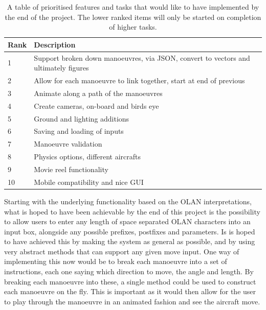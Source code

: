 \clearpage

\begin{table}[h!]
\caption{A table of prioritised features and tasks that would like to have implemented by the end of the project. The lower ranked items will only be started on completion of higher tasks.}
 \label{tbl:rank-table}
\begin{tabular}{|l|l|}
\hline
\textbf{Rank} & \textbf{Description}                                                                \\ \hline
1             & Support broken down manoeuvres, via JSON, convert to vectors and ultimately figures \\ \hline
2             & Allow for each manoeuvre to link together, start at end of previous                 \\ \hline
3             & Animate along a path of the manoeuvres                                              \\ \hline
4             & Create cameras, on-board and birds eye                                               \\ \hline
5             & Ground and lighting additions                                                       \\ \hline
6             & Saving and loading of inputs                                                        \\ \hline
7             & Manoeuvre validation                                                                \\ \hline
8             & Physics options, different aircrafts                                                \\ \hline
9             & Movie reel functionality                                                            \\ \hline
10            & Mobile compatibility and nice GUI                                                   \\ \hline
\end{tabular}
\end{table}

Starting with the underlying functionality based on the OLAN interpretations, what is hoped to have been achievable by the end of this project is the possibility to allow users to enter any length of space separated OLAN characters into an input box, alongside any possible prefixes, postfixes and parameters. Is is hoped to have achieved this by making the system as general as possible, and by using very abstract methods that can support any given move input. One way of implementing this now would be to break each manoeuvre into a set of instructions, each one saying which direction to move, the angle and length. By breaking each manoeuvre into these, a single method could be used to construct each manoeuvre on the fly. This is important as it would then allow for the user to play through the manoeuvre in an animated fashion and see the aircraft move.

